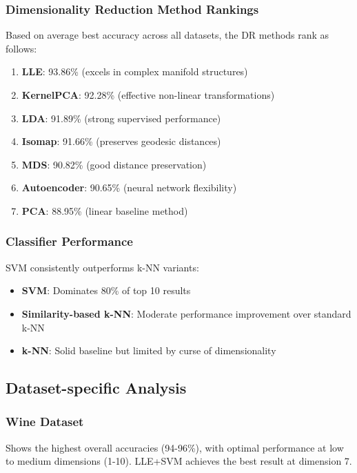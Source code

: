 \documentclass[12pt,a4paper]{article}
\begin{document}
\subsubsection{Dimensionality Reduction Method Rankings}

Based on average best accuracy across all datasets, the DR methods rank as follows:

\begin{enumerate}
    \item \textbf{LLE}: 93.86\% (excels in complex manifold structures)
    \item \textbf{KernelPCA}: 92.28\% (effective non-linear transformations)
    \item \textbf{LDA}: 91.89\% (strong supervised performance)
    \item \textbf{Isomap}: 91.66\% (preserves geodesic distances)
    \item \textbf{MDS}: 90.82\% (good distance preservation)
    \item \textbf{Autoencoder}: 90.65\% (neural network flexibility)
    \item \textbf{PCA}: 88.95\% (linear baseline method)
\end{enumerate}

\subsubsection{Classifier Performance}

SVM consistently outperforms k-NN variants:
\begin{itemize}
    \item \textbf{SVM}: Dominates 80\% of top 10 results
    \item \textbf{Similarity-based k-NN}: Moderate performance improvement over standard k-NN
    \item \textbf{k-NN}: Solid baseline but limited by curse of dimensionality
\end{itemize}

\subsection{Dataset-specific Analysis}

\subsubsection{Wine Dataset}
Shows the highest overall accuracies (94-96\%), with optimal performance at low to medium dimensions (1-10). LLE+SVM achieves the best result at dimension 7.
\end{document}
